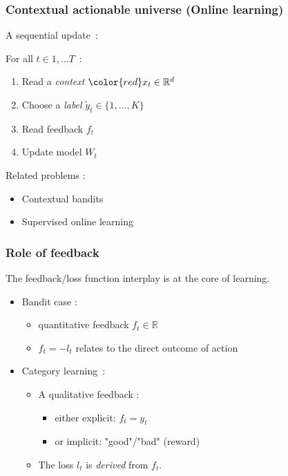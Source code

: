 \documentclass{beamer}
\begin{document}
\begin{frame}\frametitle{Contextual actionable universe (Online learning)}
A sequential update~:
\begin{block}{}
For all $t \in 1,... T$~:
\begin{enumerate}
	\item Read a \emph{context} ${\color{red}x_t} \in \mathbb{R}^d$
	\item Choose a \emph{label} $\tilde{y}_t \in \{1,...,K\}$ %
	\item Read feedback $f_t$
	\item Update model $W_t$
\end{enumerate}
\end{block}

Related problems :
\begin{itemize}
	\item Contextual bandits \cite{lai1985asymptotically,auer2002finite}
	\item Supervised online learning \cite{rosenblatt1958perceptron,duda1973pattern}
\end{itemize}

\end{frame}

\begin{frame}\frametitle{Role of feedback}
	\begin{block}{}
		The feedback/loss function interplay is at the core of learning.
	\end{block}
 \begin{itemize}
 	\item Bandit case : 
 	\begin{itemize}
 		\item quantitative feedback $f_t \in \mathbb{R}$
 		\item $f_t = -l_t$ relates to the direct outcome of action
 	\end{itemize}
 	\item Category learning~:
 	\begin{itemize}
 		\item A qualitative feedback :
 		\begin{itemize}
 			\item either explicit: $f_t = y_t$
 			\item or implicit: "good"/"bad" (reward) 
 		\end{itemize}
 		\item The loss $l_t$ is \textit{derived} from $f_t$.
 	\end{itemize}
 \end{itemize}
 
 
 
\end{frame}
\end{document}
